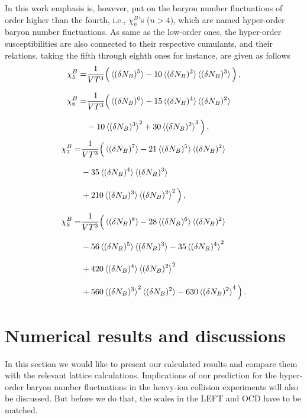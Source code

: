 \documentclass[%
reprint,
superscriptaddress,
showpacs,preprintnumbers,
 amsmath,amssymb,
 aps,
prd,
]{revtex4-1}
\begin{document}
In this work emphasis is, however, put on the baryon number fluctuations of order higher than the fourth, i.e., $\chi_n^{B}$'s ($n>4$), which are named hyper-order baryon number fluctuations. As same as the low-order ones, the hyper-order susceptibilities are also connected to their respective cumulants, and their relations, taking the fifth through eighth ones for instance, are given as follows
\begin{align}
\chi^B_5=&\frac{1}{VT^3}\Big(\braket{(\delta N_B)^5}-10\braket{(\delta N_B)^2}\braket{(\delta N_B)^3}\Big)\,,\\[2ex]
\chi^B_6=&\frac{1}{VT^3}\Big(\braket{(\delta N_B)^6}-15\braket{(\delta N_B)^4}\braket{(\delta N_B)^2}\nonumber\\[2ex]
&-10\braket{(\delta N_B)^3}^2+30\braket{(\delta N_B)^2}^3\Big)\,,
\end{align}
\begin{align}
\chi^B_7=&\frac{1}{VT^3}\Big(\braket{(\delta N_B)^7}-21\braket{(\delta N_B)^5}\braket{(\delta N_B)^2}\nonumber\\[2ex]
&-35\braket{(\delta N_B)^4}\braket{(\delta N_B)^3}\nonumber\\[2ex]
&+210\braket{(\delta N_B)^3}\braket{(\delta N_B)^2}^2\Big)\,,\\[2ex]
\chi^B_8=&\frac{1}{VT^3}\Big(\braket{(\delta N_B)^8}-28\braket{(\delta N_B)^6}\braket{(\delta N_B)^2}\nonumber\\[2ex]
&-56\braket{(\delta N_B)^5}\braket{(\delta N_B)^3}-35\braket{(\delta N_B)^4}^2\nonumber\\[2ex]
&+420\braket{(\delta N_B)^4}\braket{(\delta N_B)^2}^2\nonumber\\[2ex]
&+560\braket{(\delta N_B)^3}^2\braket{(\delta N_B)^2}-630\braket{(\delta N_B)^2}^4\Big)\,.
\end{align}


\section{Numerical results and discussions}
\label{sec:num}

In this section we would like to present our calculated results and compare them with the relevant lattice calculations. Implications of our prediction for the hyper-order baryon number fluctuations in the heavy-ion collision experiments will also be discussed. But before we do that, the scales in the LEFT and OCD have to be matched.
\end{document}
